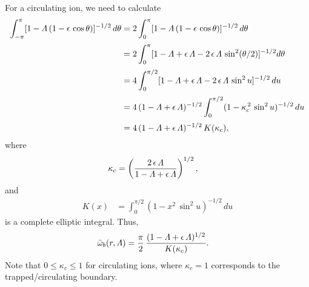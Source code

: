 \documentclass[12pt,prb,aps,notitlepage]{revtex4-1}
\begin{document}
For a  circulating ion, we need to calculate 
\begin{align}
\int_{-\pi}^{\pi} [1-{\mit\Lambda}\,(1-\epsilon\,\cos\theta)]^{-1/2}\,d\theta &= 2\int_0^\pi [1-{\mit\Lambda}\,(1-\epsilon\,\cos\theta)]^{-1/2}\,d\theta
\nonumber\\[0.5ex]
&= 2\int_0^\pi [1-{\mit\Lambda}+\epsilon\,{\mit\Lambda} - 2\,\epsilon\,{\mit\Lambda}\,\sin^2(\theta/2)]^{-1/2}d\theta\nonumber\\[0.5ex]
&= 4\int_0^{\pi/2} [1-{\mit\Lambda}+\epsilon\,{\mit\Lambda} - 2\,\epsilon\,{\mit\Lambda}\,\sin^2 u]^{-1/2}\,du\nonumber\\[0.5ex]
&= 4\,(1-{\mit\Lambda}+\epsilon\,{\mit\Lambda})^{-1/2}\int_0^{\pi/2} (1-\kappa_c^{\,2}\,\sin^2 u)^{-1/2}\,du\nonumber\\[0.5ex]
&= 4\,(1-{\mit\Lambda}+\epsilon\,{\mit\Lambda})^{-1/2}\,K(\kappa_c),
\end{align}
where
\begin{align}
\kappa_c & =\left(\frac{2\,\epsilon\,{\mit\Lambda}}{1-{\mit\Lambda}+\epsilon\,{\mit\Lambda}}\right)^{1/2},
\end{align}
and
\begin{align}
K(x) &=\int_0^{\pi/2}(1-x^2\,\sin^2 u)^{-1/2}\,du
\end{align}
is a complete elliptic integral. 
Thus,
\begin{align}\label{wbouncec}
\bar{\omega}_b(r,{\mit\Lambda}) &=\frac{\pi}{2}\,\frac{(1-{\mit\Lambda}+\epsilon\,{\mit\Lambda})^{1/2}}{K(\kappa_c)}.
\end{align}
Note that $0\leq \kappa_c\leq 1$ for circulating ions, where $\kappa_c=1$ corresponds to the trapped/circulating boundary. 
\end{document}
